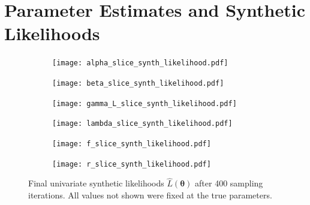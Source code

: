 \section{Parameter Estimates and Synthetic Likelihoods}

\begin{figure}[htbp]
    \centering
    \begin{subfigure}[b]{0.5\textwidth}
        \centering
        \texttt{[image: alpha\_slice\_synth\_likelihood.pdf]}
    \end{subfigure}%
    \hfill%
    \begin{subfigure}[b]{0.5\textwidth}
        \centering
        \texttt{[image: beta\_slice\_synth\_likelihood.pdf]}
    \end{subfigure}
    \begin{subfigure}[b]{0.5\textwidth}
        \centering
        \texttt{[image: gamma\_L\_slice\_synth\_likelihood.pdf]}
    \end{subfigure}%
    \hfill%
    \begin{subfigure}[b]{0.5\textwidth}
        \centering
        \texttt{[image: lambda\_slice\_synth\_likelihood.pdf]}
    \end{subfigure}
    \begin{subfigure}[b]{0.5\textwidth}
        \centering
        \texttt{[image: f\_slice\_synth\_likelihood.pdf]}
    \end{subfigure}%
    \hfill%
    \begin{subfigure}[b]{0.5\textwidth}
        \centering
        \texttt{[image: r\_slice\_synth\_likelihood.pdf]}
    \end{subfigure}%
    \caption[{
        Synthetic likelihood for all parameters
    }]{
        Final univariate synthetic likelihoods $\hat{L}(\bm{\theta})$ after
        400 sampling iterations. All values not shown were fixed at the true
        parameters.
    }
    \label{fig:final_synth_lik}
\end{figure}

